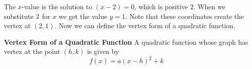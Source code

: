 \documentclass{ximera}
\begin{document}
      The $x$-value is the solution to $(x-2)=0$,
      which is positive $2$.
      When we substitute ${\color{blue}{{2}}}$ for $x$ we get the value $y=1$.
      Note that these coordinates create the vertex at $(2,1)$.
      Now we can define the vertex form of a quadratic function.

\begin{callout} \textbf{\large{Vertex Form of a Quadratic Function}}
          A quadratic function whose graph has vertex at the point $(h,k)$ is given by
$$
f(x)=a(x-h)^2+k
$$
\end{callout}

   

%
\end{document}
